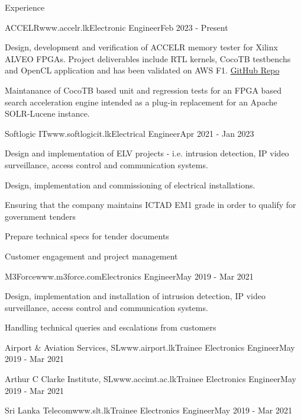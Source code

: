 \documentclass[
	11pt, %
]{resume} %
\begin{document}
\begin{rSection}{Experience}

	\begin{rSubsectionX}{ACCELR}{www.accelr.lk}{Electronic Engineer}{Feb 2023 - Present}
		\item Design, development and verification of ACCELR memory tester for Xilinx ALVEO FPGAs. Project deliverables include RTL kernels, CocoTB testbenchs and OpenCL application and has been validated on AWS F1. \href{https://github.com/accelr-net/alveo-memory-tester}{GitHub Repo}
		\item Maintanance of CocoTB based unit and regression tests for an FPGA based search acceleration engine intended as a plug-in replacement for an Apache SOLR-Lucene instance.  
	\end{rSubsectionX}

	\begin{rSubsectionX}{Softlogic IT}{www.softlogicit.lk}{Electrical Engineer}{Apr 2021 - Jan 2023}
		\item Design and implementation of ELV projects - i.e. intrusion detection, IP video surveillance, access control and communication systems.
		\item Design, implementation and commissioning of electrical installations. 
		\item Ensuring that the company maintains ICTAD EM1 grade in order to qualify for government tenders
		\item Prepare technical specs for tender documents
		\item Customer engagement and project management
	\end{rSubsectionX}

	\begin{rSubsectionX}{M3Force}{www.m3force.com}{Electronics Engineer}{May 2019 - Mar 2021}
		\item Design, implementation and installation of intrusion detection, IP video surveillance, access control and communication systems.
		\item Handling technical queries and escalations from customers 
	\end{rSubsectionX}

	\begin{rSubsectionSimpleX}{Airport \& Aviation Services, SL}{www.airport.lk}{Trainee Electronics Engineer}{May 2019 - Mar 2021}
	\end{rSubsectionSimpleX}

	\begin{rSubsectionSimpleX}{Arthur C Clarke Institute, SL}{www.accimt.ac.lk}{Trainee Electronics Engineer}{May 2019 - Mar 2021}
	\end{rSubsectionSimpleX}

	\begin{rSubsectionSimpleX}{Sri Lanka Telecom}{www.slt.lk}{Trainee Electronics Engineer}{May 2019 - Mar 2021}
	\end{rSubsectionSimpleX}


\end{rSection}
\end{document}
